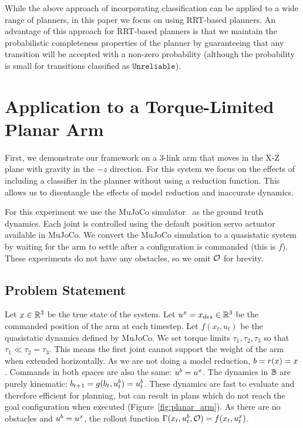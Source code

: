 While the above approach of incorporating classification can be applied to a wide range of planners, in this paper we focus on using RRT-based planners. An advantage of this approach for RRT-based planners is that we maintain the probabilistic completeness properties of the planner by guaranteeing that any transition will be accepted with a non-zero probability (although the probability is small for transitions classified as $\texttt{Unreliable}$).




\section{Application to a Torque-Limited Planar Arm}

First, we demonstrate our framework on a 3-link arm that moves in the X-Z plane with gravity in the $-z$ direction. For this system we focus on the effects of including a classifier in the planner without using a reduction function. This allows us to disentangle the effects of model reduction and inaccurate dynamics. %

For this experiment we use the MuJoCo simulator~\cite{mujoco} as the ground truth dynamics. Each joint is controlled using the default position servo actuator available in MuJoCo. We convert the MuJoCo simulation to a quasistatic system by waiting for the arm to settle after a configuration is commanded (this is $f$). These experiments do not have any obstacles, so we omit $\mathcal{O}$ for brevity.


\subsection{Problem Statement}

Let $x \in \mathbb{R}^3$ be the true state of the system. Let $u^x = x_{des} \in \mathbb{R}^3$ be the commanded position of the arm at each timestep. Let $f(x_t, u_t)$ be the quasistatic dynamics defined by MuJoCo. We set torque limits $\tau_1, \tau_2, \tau_3$ so that $\tau_1 \ll \tau_2 = \tau_3$. This means the first joint cannot support the weight of the arm when extended horizontally. As we are not doing a model reduction, $b = r(x) = x$. Commands in both spaces are also the same: $u^b = u^x$. The dynamics in $\mathbb{B}$ are purely kinematic: $b_{t+1} = g(b_t, u^b_t) = u^b_t$. These dynamics are fast to evaluate and therefore efficient for planning, but can result in plans which do not reach the goal configuration when executed (Figure~\ref{fig:planar_arm}). As there are no obstacles and $u^b = u^x$, the rollout function $\Gamma(x_t, u^b_t, \mathcal{O}) = f(x_t, u_t^x)$.

